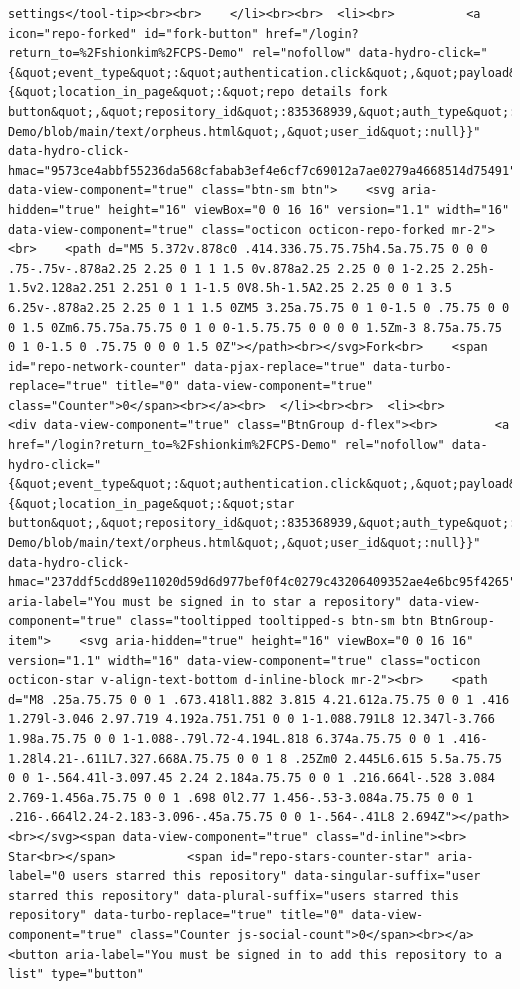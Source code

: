 \documentclass[
  letterpaper,
]{book}
\begin{document}
\begin{verbatim}
settings</tool-tip><br><br>    </li><br><br>  <li><br>          <a icon="repo-forked" id="fork-button" href="/login?return_to=%2Fshionkim%2FCPS-Demo" rel="nofollow" data-hydro-click="{&quot;event_type&quot;:&quot;authentication.click&quot;,&quot;payload&quot;:{&quot;location_in_page&quot;:&quot;repo details fork button&quot;,&quot;repository_id&quot;:835368939,&quot;auth_type&quot;:&quot;LOG_IN&quot;,&quot;originating_url&quot;:&quot;https://github.com/shionkim/CPS-Demo/blob/main/text/orpheus.html&quot;,&quot;user_id&quot;:null}}" data-hydro-click-hmac="9573ce4abbf55236da568cfabab3ef4e6cf7c69012a7ae0279a4668514d75491" data-view-component="true" class="btn-sm btn">    <svg aria-hidden="true" height="16" viewBox="0 0 16 16" version="1.1" width="16" data-view-component="true" class="octicon octicon-repo-forked mr-2"><br>    <path d="M5 5.372v.878c0 .414.336.75.75.75h4.5a.75.75 0 0 0 .75-.75v-.878a2.25 2.25 0 1 1 1.5 0v.878a2.25 2.25 0 0 1-2.25 2.25h-1.5v2.128a2.251 2.251 0 1 1-1.5 0V8.5h-1.5A2.25 2.25 0 0 1 3.5 6.25v-.878a2.25 2.25 0 1 1 1.5 0ZM5 3.25a.75.75 0 1 0-1.5 0 .75.75 0 0 0 1.5 0Zm6.75.75a.75.75 0 1 0 0-1.5.75.75 0 0 0 0 1.5Zm-3 8.75a.75.75 0 1 0-1.5 0 .75.75 0 0 0 1.5 0Z"></path><br></svg>Fork<br>    <span id="repo-network-counter" data-pjax-replace="true" data-turbo-replace="true" title="0" data-view-component="true" class="Counter">0</span><br></a><br>  </li><br><br>  <li><br>        <div data-view-component="true" class="BtnGroup d-flex"><br>        <a href="/login?return_to=%2Fshionkim%2FCPS-Demo" rel="nofollow" data-hydro-click="{&quot;event_type&quot;:&quot;authentication.click&quot;,&quot;payload&quot;:{&quot;location_in_page&quot;:&quot;star button&quot;,&quot;repository_id&quot;:835368939,&quot;auth_type&quot;:&quot;LOG_IN&quot;,&quot;originating_url&quot;:&quot;https://github.com/shionkim/CPS-Demo/blob/main/text/orpheus.html&quot;,&quot;user_id&quot;:null}}" data-hydro-click-hmac="237ddf5cdd89e11020d59d6d977bef0f4c0279c43206409352ae4e6bc95f4265" aria-label="You must be signed in to star a repository" data-view-component="true" class="tooltipped tooltipped-s btn-sm btn BtnGroup-item">    <svg aria-hidden="true" height="16" viewBox="0 0 16 16" version="1.1" width="16" data-view-component="true" class="octicon octicon-star v-align-text-bottom d-inline-block mr-2"><br>    <path d="M8 .25a.75.75 0 0 1 .673.418l1.882 3.815 4.21.612a.75.75 0 0 1 .416 1.279l-3.046 2.97.719 4.192a.751.751 0 0 1-1.088.791L8 12.347l-3.766 1.98a.75.75 0 0 1-1.088-.79l.72-4.194L.818 6.374a.75.75 0 0 1 .416-1.28l4.21-.611L7.327.668A.75.75 0 0 1 8 .25Zm0 2.445L6.615 5.5a.75.75 0 0 1-.564.41l-3.097.45 2.24 2.184a.75.75 0 0 1 .216.664l-.528 3.084 2.769-1.456a.75.75 0 0 1 .698 0l2.77 1.456-.53-3.084a.75.75 0 0 1 .216-.664l2.24-2.183-3.096-.45a.75.75 0 0 1-.564-.41L8 2.694Z"></path><br></svg><span data-view-component="true" class="d-inline"><br>          Star<br></span>          <span id="repo-stars-counter-star" aria-label="0 users starred this repository" data-singular-suffix="user starred this repository" data-plural-suffix="users starred this repository" data-turbo-replace="true" title="0" data-view-component="true" class="Counter js-social-count">0</span><br></a>        <button aria-label="You must be signed in to add this repository to a list" type="button" 
\end{verbatim}
\end{document}
